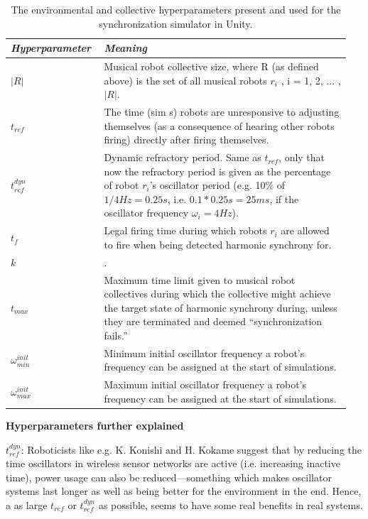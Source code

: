 	
	\begin{table}[ht]
		\centering
		\begin{tabular}{p{0.25\linewidth} | p{0.7\linewidth}}
		  \textit{\textbf{Hyperparameter}}  & \textit{\textbf{Meaning}} \\ \hline
		  $|R|$ & Musical robot collective size, where R (as defined above) is the set of all musical robots $r_i$ , i = 1, 2, ... , $|R|$. \\ \hline
		  $t_{ref} $ & The time (sim s) robots are unresponsive to adjusting themselves (as a consequence of hearing other robots firing) directly after firing themselves. \\ \hline
		  $t_{ref}^{dyn}$ & Dynamic refractory period. Same as $t_{ref}$, only that now the refractory period is given as the percentage of robot $r_i$'s oscillator period (e.g. 10\% of $1/4Hz=0.25s$, i.e. $0.1*0.25s=25ms$, if the oscillator frequency $\omega_i=4Hz$). \\ \hline
		  $t_f$ & Legal firing time during which robots $r_i$ are allowed to fire when being detected harmonic synchrony for. \\ \hline
		  $k$ & \tcol{even beat counter}. \\ \hline
		  $t_{max}$ & Maximum time limit given to musical robot collectives during which the collective might achieve the target state of harmonic synchrony during, unless they are terminated and deemed ``synchronization fails.'' \\ \hline
		  $\omega_{min}^{init}$ & Minimum initial oscillator frequency a robot's frequency can be assigned at the start of simulations. \\ \hline
		  $\omega_{max}^{init}$ & Maximum initial oscillator frequency a robot's frequency can be assigned at the start of simulations.
		\end{tabular}
		\caption{The environmental and collective hyperparameters present and used for the synchronization simulator in Unity.}
		\label{tab:synchrony_simulator_hyperparameters}
	\end{table}
	
	\textbf{Hyperparameters further explained} \nl
	
	\textbf{$t_{ref}^{dyn}$}: Roboticists like e.g. K. Konishi and H. Kokame \cite{konishi_kokame} suggest that by reducing the time oscillators in wireless sensor networks are active (i.e. increasing inactive time), power usage can also be reduced—something which makes oscillator systems last longer as well as being better for the environment in the end. Hence, a as large $t_{ref}$ or $t_{ref}^{dyn}$ as possible, seems to have some real benefits in real systems.
	

